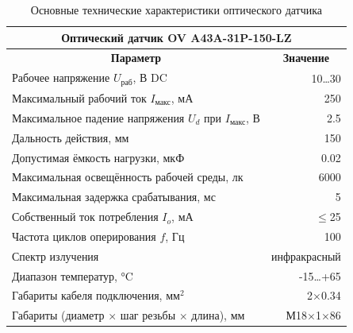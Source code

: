 \documentclass[a4paper]{article}
\begin{document}
\begin{table}[H]
    \caption{Основные технические характеристики оптического датчика}
    \centering
    \begin{tabular}{|l|r|}
        \hline
        \multicolumn{2}{|c|}{\textbf{Оптический датчик OV A43A-31P-150-LZ}} \\ \hline\hline
        \multicolumn{1}{|c|}{\textbf{Параметр}} & \multicolumn{1}{|c|}{\textbf{Значение}} \\ \hline
        Рабочее напряжение $U_{\text{раб}}$, В DC & 10\dots 30 \\ \hline
        Максимальный рабочий ток $I_{\text{макс}}$, мА & 250 \\ \hline
        Максимальное падение напряжения $U_d$ при $I_{\text{макс}}$, В & 2.5 \\ \hline
        Дальность действия, мм & 150 \\ \hline
        Допустимая ёмкость нагрузки, мкФ & 0.02 \\ \hline
        Максимальная освещённость рабочей среды, лк & 6000 \\ \hline
        Максимальная задержка срабатывания, мс & 5 \\ \hline
        Собственный ток потребления $I_o$, мА & $\leqslant$25 \\ \hline
        Частота циклов оперирования $f$, Гц & 100 \\ \hline
        Спектр излучения & инфракрасный \\ \hline
        Диапазон температур, °C & -15\dots +65 \\ \hline
        Габариты кабеля подключения, мм$^2$ & 2$\times$0.34 \\ \hline
        Габариты (диаметр $\times$ шаг резьбы $\times$ длина), мм & М18$\times$1$\times$86 \\ \hline
    \end{tabular}
    \label{tab:ovn}
\end{table}
\end{document}
